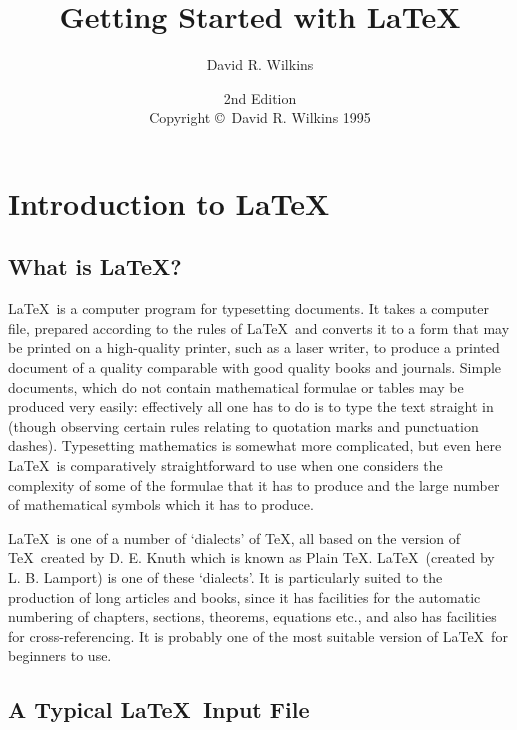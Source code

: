 ﻿\documentclass[a4paper,12pt]{article}
\begin{document}
\title{Getting Started with \LaTeX}
\author{David R. Wilkins}
\date{2nd Edition\\[3pt]
Copyright \copyright\ David R. Wilkins 1995}
\maketitle

\tableofcontents

\section{Introduction to \LaTeX}

\subsection{What is \LaTeX?}

\LaTeX\ is a computer program for typesetting documents.  It
takes a computer file, prepared according to the rules of
\LaTeX\, and converts it to a form that may be printed on a
high-quality printer, such as a laser writer, to produce
a printed document of a quality comparable with good
quality books and journals.  Simple documents, which do
not contain mathematical formulae or tables may be produced
very easily: effectively all one has to do is to type the
text straight in (though observing certain rules relating to
quotation marks and punctuation dashes).  Typesetting
mathematics is somewhat more complicated, but even here
\LaTeX\ is comparatively straightforward to use when one
considers the complexity of some of the formulae that it
has to produce and the large number of mathematical symbols
which it has to produce.

\LaTeX\ is one of a number of `dialects' of \TeX, all based on the
version of \TeX\ created by D. E. Knuth which is known as
Plain \TeX.  \LaTeX\ (created by L. B. Lamport) is one of
these `dialects'.  It is particularly suited to the
production of long articles and books, since it has
facilities for the automatic numbering of chapters, sections,
theorems, equations etc., and also has facilities for
cross-referencing.  It is probably one of the most suitable
version of \LaTeX\ for beginners to use.

\subsection{A Typical \LaTeX\ Input File}
\end{document}
